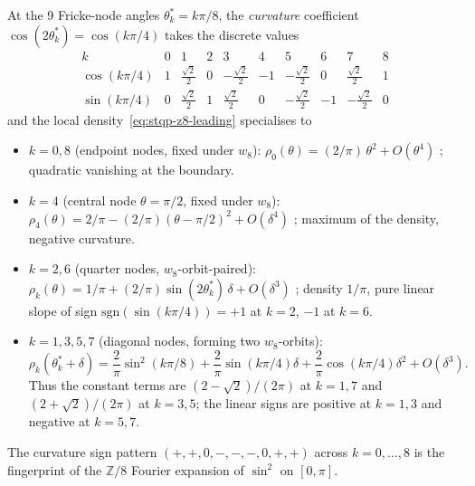 \begin{theorem}
\label{thm:stqp-fricke-z8-phase-subleading}
%
%
At the 9 Fricke-node angles $\theta^*_k = k\pi/8$, the
\emph{curvature} coefficient $\cos(2\theta^*_k) = \cos(k\pi/4)$
takes the discrete values
\begin{equation}
\label{eq:stqp-z8-curvature-table}
\begin{array}{r|ccccccccc}
k & 0 & 1 & 2 & 3 & 4 & 5 & 6 & 7 & 8 \\\hline
\cos(k\pi/4) & 1 & \frac{\sqrt 2}{2} & 0 & -\frac{\sqrt 2}{2} & -1
 & -\frac{\sqrt 2}{2} & 0 & \frac{\sqrt 2}{2} & 1 \\
\sin(k\pi/4) & 0 & \frac{\sqrt 2}{2} & 1 & \frac{\sqrt 2}{2} & 0
 & -\frac{\sqrt 2}{2} & -1 & -\frac{\sqrt 2}{2} & 0
\end{array}
\end{equation}
and the local density~\eqref{eq:stqp-z8-leading} specialises to
\begin{itemize}
\item $k = 0, 8$ (endpoint nodes, fixed under $w_8$):
 $\rho_0(\theta) = (2/\pi)\,\theta^2 + O(\theta^4)$
; quadratic vanishing at the boundary.
\item $k = 4$ (central node $\theta = \pi/2$, fixed under $w_8$):
 $\rho_4(\theta) = 2/\pi - (2/\pi)(\theta - \pi/2)^2 + O(\delta^4)$
; maximum of the density, negative curvature.
\item $k = 2, 6$ (quarter nodes, $w_8$-orbit-paired):
 $\rho_k(\theta) = 1/\pi + (2/\pi)\sin(2\theta^*_k)\,\delta
 + O(\delta^3)$
; density $1/\pi$, pure linear slope of sign
 $\mathrm{sgn}(\sin(k\pi/4)) = +1$ at $k = 2$, $-1$ at $k = 6$.
\item $k = 1, 3, 5, 7$ (diagonal nodes, forming two
 $w_8$-orbits):
 \[
 \rho_k(\theta^*_k+\delta)
 =
 \frac{2}{\pi}\sin^2(k\pi/8)
 +\frac{2}{\pi}\sin(k\pi/4)\delta
 +\frac{2}{\pi}\cos(k\pi/4)\delta^2
 +O(\delta^3).
 \]
Thus the constant terms are
$(2-\sqrt2)/(2\pi)$ at $k=1,7$ and
$(2+\sqrt2)/(2\pi)$ at $k=3,5$; the linear signs are positive at
$k=1,3$ and negative at $k=5,7$.
\end{itemize}
The curvature sign pattern
$(+, +, 0, -, -, -, 0, +, +)$ across $k = 0, \ldots, 8$ is the
fingerprint of the $\mathbb Z/8$ Fourier expansion of $\sin^2$ on
$[0, \pi]$.
\end{theorem}

